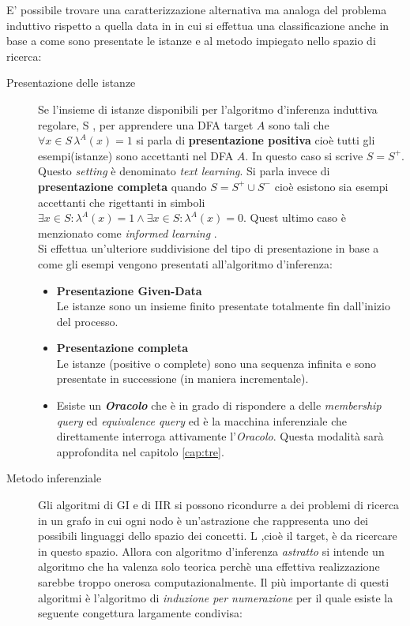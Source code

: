 E' possibile trovare una caratterizzazione alternativa ma analoga del problema induttivo rispetto a quella data in \cite{Angluin83} in cui si effettua una classificazione anche in base a come sono presentate le istanze e al metodo impiegato nello spazio di ricerca:
\begin{description}
\item[Presentazione delle istanze]Se l'insieme di istanze disponibili per l'algoritmo d'inferenza induttiva regolare, S , per apprendere una \ac{DFA}  target $A$ sono tali che $\forall x \in S \,\lambda^{A}(x) = 1$ si parla di \textbf{presentazione positiva} cioè tutti gli esempi(istanze) sono accettanti nel \ac{DFA} $A$. In questo caso si scrive $S=S^{+}$. Questo \textit{setting} è  denominato \textit{text learning}\cite[p. 217]{DeLaHiguera10}. Si parla invece di \textbf{presentazione completa} quando $S=S^{+} \cup S^{-}$ cioè esistono sia esempi accettanti che rigettanti in simboli $\exists x \in S :   \lambda^{A}(x)=1 \land \exists x \in S :   \lambda^{A}(x)=0$. Quest ultimo caso è menzionato come \textit{informed learning} \cite[p. 237]{DeLaHiguera10} .\\

Si effettua un'ulteriore suddivisione del tipo di presentazione in base a come gli esempi vengono presentati all'algoritmo d'inferenza:
\begin{itemize}
\item \textbf{Presentazione Given-Data}\\Le istanze sono un insieme finito presentate totalmente fin dall'inizio del processo.
\item \textbf{Presentazione completa}\\Le istanze (positive o complete) sono una sequenza infinita e sono presentate in successione (in maniera incrementale).  
\item Esiste un \textbf{\textit{Oracolo}} che è in grado di rispondere a delle \textit{membership query} ed \textit{equivalence query} ed è la macchina inferenziale che direttamente interroga attivamente l'\textit{Oracolo}. Questa modalità sarà approfondita nel capitolo \ref{cap:tre}.
\end{itemize}
\item[Metodo inferenziale]Gli algoritmi di \ac{GI} e di \ac{IIR} si possono ricondurre a dei problemi di ricerca in un grafo in cui ogni nodo è un'astrazione che rappresenta uno dei possibili linguaggi dello spazio dei concetti. \ac{L} ,cioè il target, è da ricercare in questo spazio.  Allora con algoritmo d'inferenza \textit{astratto} si intende un algoritmo che ha valenza solo teorica perchè una effettiva realizzazione sarebbe troppo onerosa computazionalmente. Il più importante di questi algoritmi è l'algoritmo di \textit{induzione per numerazione} per il quale esiste la seguente congettura largamente condivisa:


\end{description}
